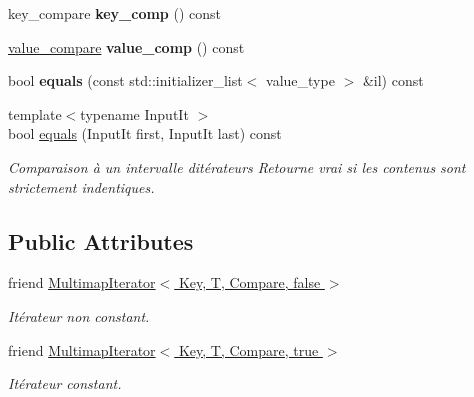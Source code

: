 \begin{DoxyCompactItemize}
\mbox{\label{classMultimap_ae49e443fd752bd5954b50f1b8fbaa5c4}} 
key\+\_\+compare {\bfseries key\+\_\+comp} () const
\item 
\mbox{\label{classMultimap_a4d832c78ba715b043a078e56dc376aea}} 
\hyperlink{classMultimap_1_1value__compare}{value\+\_\+compare} {\bfseries value\+\_\+comp} () const
\item 
\mbox{\label{classMultimap_ad912308e6c19b562697ab713b0ccdd33}} 
bool {\bfseries equals} (const std\+::initializer\+\_\+list$<$ value\+\_\+type $>$ \&il) const
\item 
\mbox{\label{classMultimap_a90017019b311b34d667a7b0962fe1d13}} 
{\footnotesize template$<$typename Input\+It $>$ }\\bool \hyperlink{classMultimap_a90017019b311b34d667a7b0962fe1d13}{equals} (Input\+It first, Input\+It last) const
\begin{DoxyCompactList}\small\item\em Comparaison à un intervalle d\textquotesingle{}itérateurs Retourne vrai si les contenus sont strictement indentiques. \end{DoxyCompactList}\end{DoxyCompactItemize}
\subsection*{Public Attributes}
\begin{DoxyCompactItemize}
\item 
\mbox{\label{classMultimap_a2f1ded72848f333473e2e5d74f510474}} 
friend \hyperlink{classMultimap_a2f1ded72848f333473e2e5d74f510474}{Multimap\+Iterator$<$ Key, T, Compare, false $>$}
\begin{DoxyCompactList}\small\item\em Itérateur non constant. \end{DoxyCompactList}\item 
\mbox{\label{classMultimap_afbda4125c5317ddde9caff060b3d82d6}} 
friend \hyperlink{classMultimap_afbda4125c5317ddde9caff060b3d82d6}{Multimap\+Iterator$<$ Key, T, Compare, true $>$}
\begin{DoxyCompactList}\small\item\em Itérateur constant. \end{DoxyCompactList}\end{DoxyCompactItemize}
